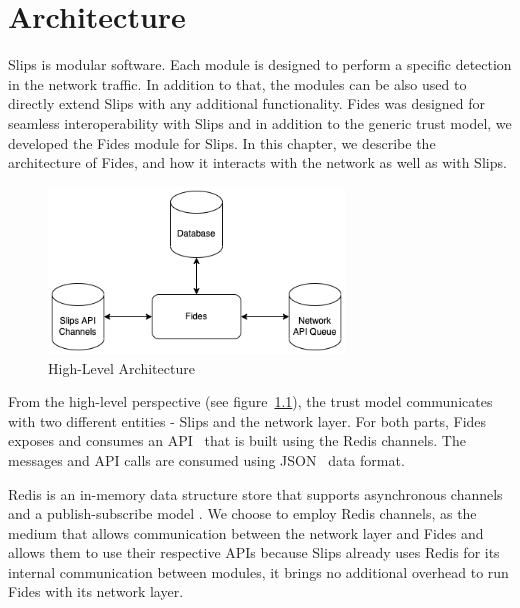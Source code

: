 \chapter{Architecture}
\label{ch:architecture}
Slips is modular software. Each module is designed to perform a specific detection in the network traffic.\cite{slips}
In addition to that, the modules can be also used to directly extend Slips with any additional functionality. 
Fides was designed for seamless interoperability with Slips and in addition to the generic trust model, we developed the Fides module for Slips.
In this chapter, we describe the architecture of Fides, and how it interacts with the network as well as with Slips.

\begin{figure}[ht]
    \centering
    \includegraphics[width=0.7\textwidth]{assets/high_architecture.png}
    \caption{High-Level Architecture}
    \label{fig:high-level-architecture}
\end{figure}

From the high-level perspective (see figure~\ref{fig:high-level-architecture}), the trust model communicates with two different entities - Slips and the network layer.
For both parts, Fides exposes and consumes an API~\cite{api} that is built using the Redis channels.
The messages and API calls are consumed using JSON~\cite{json} data format.

Redis is an in-memory data structure store that supports asynchronous channels and a publish-subscribe model \cite{redis}.
We choose to employ Redis channels, as the medium that allows communication between the network layer and Fides and allows them to use their respective APIs because Slips already uses Redis for its internal communication between modules, it brings no additional overhead to run Fides with its network layer.



